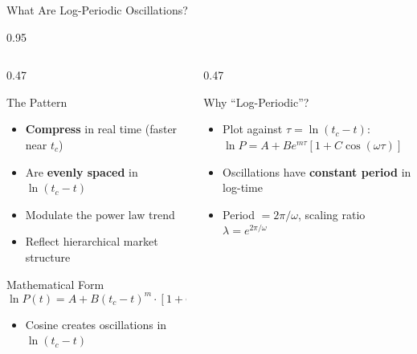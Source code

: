 \documentclass[9pt, aspectratio=169, t]{beamer}
\begin{document}
\begin{frame}{What Are Log-Periodic Oscillations?}
    \begin{cminipage}{0.95\textwidth}
    {\footnotesize
    \begin{columns}[T]
        \begin{column}{0.47\textwidth}
            \begin{block}{The Pattern}
                \begin{itemize}\setlength{\itemsep}{0pt}
                    \item \textbf{Compress} in real time (faster near $t_c$)
                    \item Are \textbf{evenly spaced} in $\ln(t_c - t)$
                    \item Modulate the power law trend
                    \item Reflect hierarchical market structure
                \end{itemize}
            \end{block}

            \begin{exampleblock}{Mathematical Form}
                $$\ln P(t) = A + B(t_c-t)^m \cdot [1 + C\cos(\omega\ln(t_c-t))]$$
                \begin{itemize}\setlength{\itemsep}{0pt}
                    \item Cosine creates oscillations in $\ln(t_c - t)$
                \end{itemize}
            \end{exampleblock}
        \end{column}
        \begin{column}{0.47\textwidth}
            \begin{alertblock}{Why ``Log-Periodic''?}
                \begin{itemize}\setlength{\itemsep}{0pt}
                    \item Plot against $\tau = \ln(t_c - t)$: $\ln P = A + Be^{m\tau}[1 + C\cos(\omega\tau)]$
                    \item Oscillations have \textbf{constant period} in log-time
                    \item Period $= 2\pi/\omega$, scaling ratio $\lambda = e^{2\pi/\omega}$
                \end{itemize}
            \end{alertblock}


\end{column}
\end{columns}}
\end{cminipage}
\end{frame}
\end{document}
